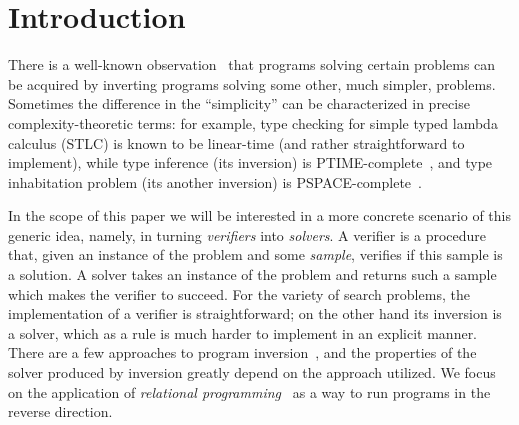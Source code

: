 \section{Introduction}


There is a well-known observation~\cite{lozov2019relational,SemanticsModifiers1} that programs solving certain problems can be acquired by inverting programs solving some other, much simpler, problems.
Sometimes the difference in the ``simplicity'' can be characterized in precise complexity-theoretic terms: for example, type checking for simple typed lambda calculus (STLC) is known to be linear-time (and rather straightforward to implement), while type inference (its inversion) is PTIME-complete~\cite{mairson2004linear}, and type inhabitation problem (its another inversion) is PSPACE-complete~\cite{urzyczyn1997inhabitation}.




In the scope of this paper we will be interested in a more concrete scenario of this generic idea, namely, in turning \emph{verifiers} into \emph{solvers}.
A verifier is a procedure that, given an instance of the problem and some \emph{sample}, verifies if this sample is a solution.
A solver takes an instance of the problem and returns such a sample which makes the verifier to succeed.
For the variety of search problems, the implementation of a verifier is straightforward; on the other hand its inversion is a solver, which as a rule is much harder to implement in an explicit manner.
There are a few approaches to program inversion~\cite{RevURA,aman2020foundations}, and the properties of the solver produced by inversion greatly depend on the approach utilized.
We focus on the application of \emph{relational programming}~\cite{TheReasonedSchemer} as a way to run programs in the reverse direction.

